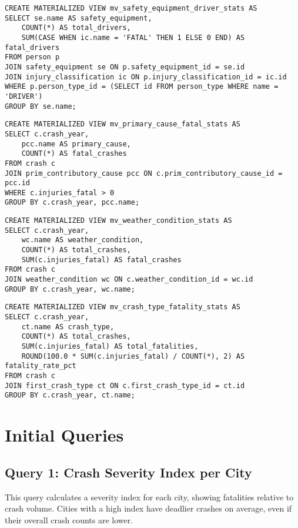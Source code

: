 \documentclass[12pt]{article}
\begin{document}
{\scriptsize
\begin{verbatim}
CREATE MATERIALIZED VIEW mv_safety_equipment_driver_stats AS
SELECT se.name AS safety_equipment,
    COUNT(*) AS total_drivers,
    SUM(CASE WHEN ic.name = 'FATAL' THEN 1 ELSE 0 END) AS fatal_drivers
FROM person p
JOIN safety_equipment se ON p.safety_equipment_id = se.id
JOIN injury_classification ic ON p.injury_classification_id = ic.id
WHERE p.person_type_id = (SELECT id FROM person_type WHERE name = 'DRIVER')
GROUP BY se.name;
\end{verbatim}}

{\scriptsize
\begin{verbatim}
CREATE MATERIALIZED VIEW mv_primary_cause_fatal_stats AS
SELECT c.crash_year,
    pcc.name AS primary_cause, 
    COUNT(*) AS fatal_crashes
FROM crash c
JOIN prim_contributory_cause pcc ON c.prim_contributory_cause_id = pcc.id
WHERE c.injuries_fatal > 0
GROUP BY c.crash_year, pcc.name;
\end{verbatim}}

{\scriptsize
\begin{verbatim}
CREATE MATERIALIZED VIEW mv_weather_condition_stats AS
SELECT c.crash_year,
    wc.name AS weather_condition, 
    COUNT(*) AS total_crashes, 
    SUM(c.injuries_fatal) AS fatal_crashes
FROM crash c
JOIN weather_condition wc ON c.weather_condition_id = wc.id
GROUP BY c.crash_year, wc.name;
\end{verbatim}}

{\scriptsize
\begin{verbatim}
CREATE MATERIALIZED VIEW mv_crash_type_fatality_stats AS
SELECT c.crash_year,
    ct.name AS crash_type, 
    COUNT(*) AS total_crashes, 
    SUM(c.injuries_fatal) AS total_fatalities,
    ROUND(100.0 * SUM(c.injuries_fatal) / COUNT(*), 2) AS fatality_rate_pct
FROM crash c
JOIN first_crash_type ct ON c.first_crash_type_id = ct.id
GROUP BY c.crash_year, ct.name;
\end{verbatim}}

\section{Initial Queries}

\subsection{Query 1: Crash Severity Index per City}

This query calculates a severity index for each city, showing fatalities relative to crash volume. Cities with a high index have deadlier crashes on average, even if their overall crash counts are lower.
\end{document}
